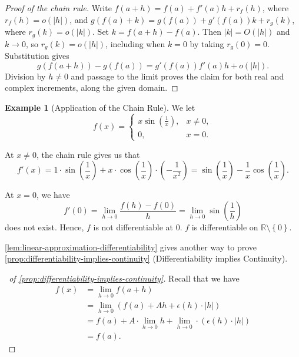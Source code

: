 \documentclass[11pt]{article}
\numberwithin{equation}{section}
\theoremstyle{definition}
\newtheorem{example}[theorem]{Example}
\theoremstyle{remark}
\newcommand{\pqty}[1]{\left(#1\right)}
\newcommand{\Bqty}[1]{\left\{#1\right\}}
\newcommand{\abs}[1]{\left|#1\right|}
\newcommand{\RR}{\mathbb R}
\begin{document}
\begin{proof}[Proof of the chain rule]
Write \(f(a+h)=f(a)+f'(a)h+r_f(h)\), where \(r_f(h)=o(|h|)\), and
\(g(f(a)+k)=g(f(a))+g'(f(a))k+r_g(k)\), where \(r_g(k)=o(|k|)\).
Set \(k=f(a+h)-f(a)\). Then \(|k|=O(|h|)\) and \(k\to0\), so
\(r_g(k)=o(|h|)\), including when \(k=0\) by taking \(r_g(0)=0\).
Substitution gives
\[
g(f(a+h))-g(f(a))=g'(f(a))f'(a)h+o(|h|).
\]
Division by \(h\ne0\) and passage to the limit proves the claim for both real
and complex increments, along the given domain.
\end{proof}

\begin{example}[Application of the Chain Rule]\label{analysis-unit-0110}
    \label{ex:application-chain-rule}%
    We let
    \[
        f\pqty{x} = \begin{cases}
            x \sin \pqty{\frac{1}{x}}, & x \neq 0, \\
            0, & x = 0.
        \end{cases}
    \]

    At \(x \neq 0\), the chain rule gives us that
    \[
        f'\pqty{x} = 1 \cdot \sin \pqty{\frac{1}{x}} + x \cdot \cos \pqty{\frac{1}{x}} \cdot \pqty{- \frac{1}{x^2}} = \sin \pqty{\frac{1}{x}} - \frac{1}{x} \cos \pqty{\frac{1}{x}}.
    \]

    At \(x = 0\), we have
    \[
        f'\pqty{0} = \lim_{h \to 0} \frac{f\pqty{h} - f\pqty{0}}{h} = \lim_{h \to 0} \sin \pqty{\frac{1}{h}}
    \]
    does not exist. Hence, \(f\) is not differentiable at \(0\). \(f\) is differentiable on \(\RR \setminus \Bqty{0}\).
\end{example}

\autoref{lem:linear-approximation-differentiability} gives another way to prove \autoref{prop:differentiability-implies-continuity} (Differentiability implies Continuity).

\begin{proof}[\proofname\ of \autoref{prop:differentiability-implies-continuity}]
    Recall that we have
    \begin{align*}
        f\pqty{x} &= \lim_{h \to 0} f\pqty{a + h} \\
        &= \lim_{h \to 0} \pqty{f\pqty{a} + Ah + \epsilon\pqty{h} \cdot \abs{h}} \\
        &= f\pqty{a} + A \cdot \lim_{h \to 0} h + \lim_{h \to 0} \cdot \pqty{\epsilon\pqty{h} \cdot \abs{h}} \\
        &= f\pqty{a}.
    \end{align*}
\end{proof}
\end{document}
